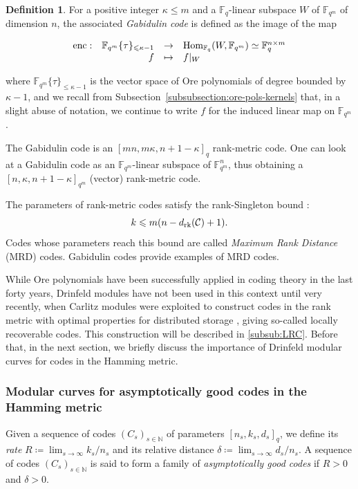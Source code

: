 \documentclass[11pt]{article}
\theoremstyle{definition}
\newtheorem{definition}[theorem]{Definition}
\newcommand{\Function}[5]{
  \[
    \begin{array}{rrcl}
    #1: & #2 & \to     & #3 \\
        & #4 & \mapsto & #5
    \end{array}
  \]
}
\renewcommand\leq{\leqslant}
\newcommand\N{\mathbb{N}}
\newcommand\F{\mathbb{F}}
\newcommand\Fq{\mathbb{F}_q}
\newcommand\Fqm{\F_{q^m}}
\newcommand{\Hom}{\text{\rm Hom}}
\newcommand\rk{\text{\rm rk}}
\DeclareMathOperator{\enc}{\mathrm{enc}}
\begin{document}
\begin{definition}
For a positive integer $\kappa \leq m$ and a $\Fq$-linear subspace $W$ of $\Fqm$
of dimension $n$, the associated \emph{Gabidulin code} is defined as the image of the map 
\Function
      {\enc}
      {\Fqm\{\tau\}_{\leq \kappa-1}}
      {\Hom_{\Fq}(W,\Fqm)\simeq\Fq^{n\times m}}
      {f}
      {f|_W}
where $\Fqm\{\tau\}_{\leq \kappa-1}$ is the vector space of Ore polynomials of degree bounded by $\kappa-1$, and we recall from Subsection~\ref{subsubsection:ore-pols-kernels} that, in a slight abuse of notation, we continue to write $f$ for the induced linear map on $\Fqm$.

The Gabidulin code is an $[mn,m\kappa,n{+}1{-}\kappa]_q$ rank-metric code. One can look at a Gabidulin code as an $\Fqm$-linear subspace of $\Fqm^n$, thus obtaining a $[n,\kappa,n{+}1{-}\kappa]_{q^m}$ (vector) rank-metric code.
\end{definition}
The parameters of rank-metric codes satisfy the rank-Singleton bound \cite[Theorem 3.5]{Gor21}:
$$k\leq m (n-d_\rk(\mathcal{C})+1).$$
Codes whose parameters reach this bound are called \emph{Maximum Rank Distance} (MRD) codes. Gabidulin codes provide examples of MRD codes.

While Ore polynomials have been successfully applied in coding theory in the last forty years, Drinfeld modules have not been used in this context until very recently, when Carlitz modules were exploited to construct codes in the rank metric with optimal properties for distributed storage \cite{BDM24preprint}, giving so-called locally recoverable codes. This construction will be described in \cref{subsub:LRC}. Before that, in the next section, we briefly discuss the importance of Drinfeld modular curves for codes in the Hamming metric.

\subsubsection{Modular curves for asymptotically good codes in the Hamming metric}\label{subsub:tower}

Given a sequence of codes $(C_s)_{s\in \N}$ of parameters $[n_s,k_s,d_s]_q$, we define its \emph{rate} $R \coloneqq \lim_{s \rightarrow \infty} k_s/n_s$ and its relative distance $\delta \coloneqq \lim_{s \rightarrow \infty} d_s/n_s$. A sequence of codes $(C_s)_{s\in \N}$ is said to form a family of \emph{asymptotically good codes} if $R > 0$ and $\delta>0$.
\end{document}
